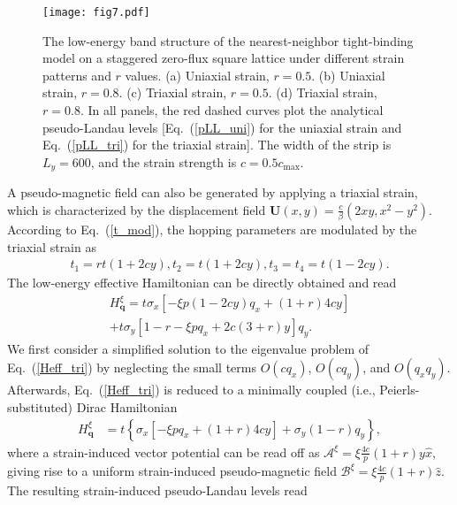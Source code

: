 \documentclass[aps, twocolumn, floatfix, superscriptaddress, prb]{revtex4-1}
\begin{document}
%
\begin{figure}[t]
\centering
\texttt{[image: fig7.pdf]}
\caption{The low-energy band structure of the nearest-neighbor tight-binding model on a staggered zero-flux square lattice under different strain patterns and $r$ values. (a) Uniaxial strain, $r=0.5$. (b) Uniaxial strain, $r=0.8$. (c) Triaxial strain, $r=0.5$. (d) Triaxial strain, $r=0.8$. In all panels, the red dashed curves plot the analytical pseudo-Landau levels [Eq.~(\ref{pLL_uni}) for the uniaxial strain and Eq.~(\ref{pLL_tri}) for the triaxial strain]. The width of the strip is $L_y=600$, and the strain strength is $c=0.5c_{\text{max}}$.
}\label{fig7}
\end{figure}
%


A pseudo-magnetic field can also be generated by applying a triaxial strain, which is characterized by the displacement field ${\bm U}(x,y)=\frac{c}{\beta}(2xy,x^2-y^2)$. According to Eq.~(\ref{t_mod}), the hopping parameters are modulated by the triaxial strain as
%
\begin{equation} \label{t_mod_tri}
\begin{split}
t_1=rt(1+2cy), t_2=t(1+2cy),
t_3=t_4=t(1-2cy).
\end{split}
\end{equation}
%
The low-energy effective Hamiltonian can be directly obtained and read
%
\begin{equation} \label{Heff_tri}
\begin{split}
{
H_{\bm q}^\xi=t\sigma_x\left[-\xi {p}(1-2cy)q_x+(1+r)4cy\right]
}
\\
{
+t\sigma_y\left[1-r-\xi pq_x+2c(3+r)y\right]q_y.
}
\end{split}
\end{equation}
%
We first consider a simplified solution to the eigenvalue problem of Eq.~(\ref{Heff_tri}) by neglecting the small terms $O(cq_x)$, $O(cq_y)$, and $O(q_xq_y)$. Afterwards, Eq.~(\ref{Heff_tri}) is reduced to a minimally coupled (i.e., Peierls-substituted) Dirac Hamiltonian
%
\begin{align} \label{Heff_tri_simp}
H_{\bm q}^\xi &= t\left\lbrace\sigma_x\left[-\xi pq_x+(1+r)4cy\right]+\sigma_y\left(1-r\right)q_y\right\rbrace,
\end{align}
%
where a strain-induced vector potential can be read off as {$\bm {\mathcal A}^\xi= \xi \tfrac{4c}{p} (1+r)y\hat x$}, giving rise to a uniform strain-induced pseudo-magnetic field {$\bm{\mathcal B}^\xi=\xi\tfrac{4c}{p}(1+r)\hat{z}$}. The resulting strain-induced pseudo-Landau levels read
\end{document}
